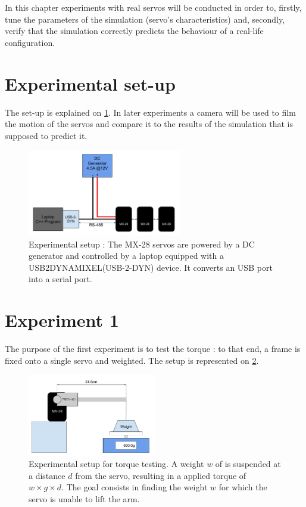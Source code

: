 In this chapter experiments with real servos will be conducted in order to, firstly, tune the parameters of the simulation (servo's characteristics) and, secondly, verify that the simulation correctly predicts the behaviour of a real-life configuration.

\section{Experimental set-up}
The set-up is explained on \cref{fig:exp_setup}. In later experiments a camera will be used to film the motion of the servos and compare it to the results of the simulation that is supposed to predict it.

\begin{figure}[htp]
\center
\includegraphics[width=0.6\textwidth]{figures/exp_setup}
\caption[Experimental setup]{Experimental setup : The MX-28 servos are powered by a DC generator and controlled by a laptop equipped with a USB2DYNAMIXEL(USB-2-DYN) device. It converts an USB port into a serial port.}
\label{fig:exp_setup}
\end{figure}

\section{Experiment 1 \label{sec:exp1}}
The purpose of the first experiment is to test the torque : to that end, a frame is fixed onto a single servo and weighted. The setup is represented on \cref{fig:exp1}.

\begin{figure}[htp]
\center
    \includegraphics[width = 0.5\textwidth]{figures/exp1}
    \caption[Experimental setup for torque testing]{Experimental setup for torque testing. A weight $w$ of is suspended at a distance $d$ from the servo, resulting in a applied torque of $w \times g \times d$. The goal consists in finding the weight $w$ for which the servo is unable to lift the arm.}
    \label{fig:exp1}
\end{figure}

